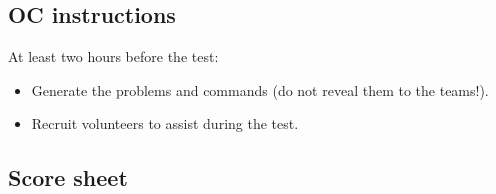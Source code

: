 \subsection*{OC instructions}

At least two hours before the test:
\begin{itemize}
	\item Generate the problems and commands (do not reveal them to the teams!).
	\item Recruit volunteers to assist during the test.
\end{itemize}


\subsection*{Score sheet}


